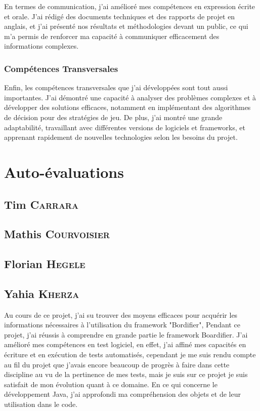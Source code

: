 En termes de communication, j'ai amélioré mes compétences en expression écrite et orale. J'ai rédigé des documents techniques et des rapports de projet en anglais, et j'ai présenté nos résultats et méthodologies devant un public, ce qui m'a permis de renforcer ma capacité à communiquer efficacement des informations complexes.

\subsubsection*{Compétences Transversales}

Enfin, les compétences transversales que j'ai développées sont tout aussi importantes. J'ai démontré une capacité à analyser des problèmes complexes et à développer des solutions efficaces, notamment en implémentant des algorithmes de décision pour des stratégies de jeu. De plus, j'ai montré une grande adaptabilité, travaillant avec différentes versions de logiciels et frameworks, et apprenant rapidement de nouvelles technologies selon les besoins du projet.


\section{Auto-évaluations}

\subsection*{Tim \textsc{Carrara}}

\subsection*{Mathis \textsc{Courvoisier}}

\subsection*{Florian \textsc{Hegele}}

\subsection*{Yahia \textsc{Kherza}}

Au cours de ce projet, j’ai su trouver des moyens efficaces pour acquérir les informations nécessaires à l’utilisation du framework "Bordifier", 
Pendant ce projet, j'ai réussis à comprendre en grande partie le framework Boardifier.
J’ai amélioré mes compétences en test logiciel, en effet, j'ai affiné mes capacités en écriture et en exécution de tests automatisés, cependant je me suis rendu compte au fil du projet que j'avais encore beaucoup de progrès à faire dans cette discipline au vu de la pertinence de mes tests, mais je suis sur ce projet je suis satisfait de mon évolution quant à ce domaine.
En ce qui concerne le développement Java, j’ai approfondi ma compréhension des objets et de leur utilisation dans le code.

